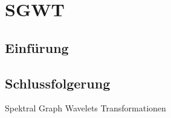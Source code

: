 %
%
%
\chapter{SGWT\label{chapter:sgwt}}
\begin{refsection}

\section{Einf\"urung}

\section{Schlussfolgerung}


Spektral Graph Wavelets Transformationen 


\cite{hammond_wavelets_2011}
\cite{hammond_image_nodate}
\cite{shuman_emerging_2013}
\cite{xu_graph_2019}
\cite{chung_spectral_nodate}
\cite{spielman_spectral_nodate}
\cite{nica_brief_2018}
\cite{marsden_eigenvalues_nodate}


\printbibliography[heading=subbibliography]
\end{refsection}

